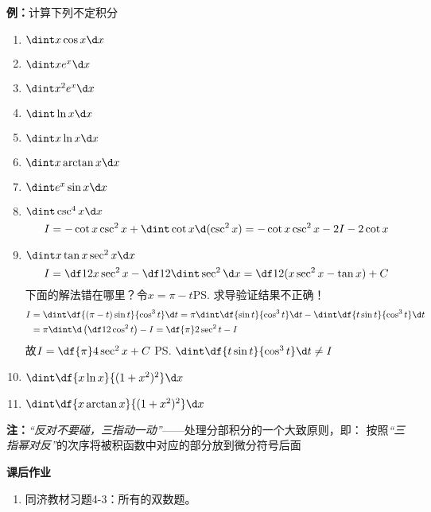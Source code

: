 {\bf 例：}计算下列不定积分
\begin{enumerate}[(1)]
  \setlength{\itemindent}{1cm}
  \item $\dint x\cos x\d x$ 
  \item $\dint xe^x\d x$ 
  \item $\dint x^2e^x\d x$ 
  \item $\dint\ln x\d x$
  \item $\dint x\ln x\d x$ 
  \item $\dint x\arctan x\d x$ 
  \item $\dint e^x\sin x\d x$
  \item $\dint\csc^4x\d x$\\
  $$I=-\cot x\csc^2x+\dint\cot x\d(\csc^2x)=-\cot x\csc^2x-2I-2\cot x$$
  \item $\dint x\tan x\sec^2x\d x$
  $$I=\df12x\sec^2x-\df12\dint\sec^2\d x=\df12(x\sec^2x-\tan x)+C$$
  下面的解法错在哪里？令$x=\pi-t$\ps{求导验证结果不正确！}{\b
  \begin{align}
  I&=\dint\df{(\pi-t)\sin t}{\cos^3t}\d t=\pi\dint\df{\sin t}{\cos^3t}\d t
  -\dint\df{t\sin t}{\cos^3t}\d t\notag\\
  &=\pi\dint\d\left(\df1{2\cos^2t}\right)-I=\df{\pi}2\sec^2t-I\notag
  \end{align}
  故$I=\df{\pi}4\sec^2x+C$}
  \ps{$\dint\df{t\sin t}{\cos^3t}\d t\ne I$}
  \item $\dint\df{x\ln x}{(1+x^2)^2}\d x$
  \item $\dint\df{x\arctan x}{(1+x^2)^2}\d x$
\end{enumerate}

{\bf 注：}{\b {\it “{反对}不要碰，{三指}动一动”}——处理分部积分的一个大致原则，即：
按照{\it {“三指幂对反”}}的次序将被积函数中对应的部分放到微分符号后面}

\begin{ext}
 	{\bf 课后作业}
	
	\begin{enumerate}
	  \item 同济教材习题4-3：所有的双数题。
	\end{enumerate}
\end{ext}

